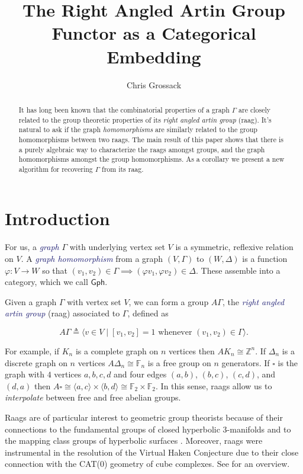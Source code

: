 \documentclass[microtype]{gtpart}
\author{Chris Grossack}
\title{The Right Angled Artin Group Functor as a Categorical Embedding}
\theoremstyle{definition}
\theoremstyle{theorem}
\newcommand{\teq}{\triangleq}
\newcommand*{\important}[1]{\textcolor{MidnightBlue}{\emph{#1}}}
\begin{document}
\maketitle

\begin{abstract}
  It has long been known that the combinatorial properties of a graph $\Gamma$
  are closely related to the group theoretic properties of its 
  \emph{right angled artin group} (raag). It's natural to ask if the 
  graph \emph{homomorphisms} are similarly related to the group homomorphisms 
  between two raags. The main result of this paper shows that there 
  is a purely algebraic way to characterize the raags amongst groups, and 
  the graph homomorphisms amongst the group homomorphisms. 
  As a corollary we 
  present a new algorithm for recovering $\Gamma$ from its raag.
\end{abstract}

\section{Introduction}
\label{intro}
  For us, a \important{graph} $\Gamma$ with underlying vertex set $V$ is a 
  symmetric, reflexive relation on $V$. A \important{graph homomorphism} from 
  a graph $(V,\Gamma)$ to $(W,\Delta)$ is a 
  function $\varphi : V \to W$ so that $(v_1, v_2) \in \Gamma \implies (\varphi v_1, \varphi v_2) \in \Delta$.
  These assemble into a category, which we call $\mathsf{Gph}$.

  Given a graph $\Gamma$ with vertex set $V$, we can form a group $A\Gamma$, the 
  \important{right angled artin group} (raag) associated to $\Gamma$, defined as

  \[ A\Gamma \teq \langle v \in V \mid [v_1, v_2] = 1 \text{ whenever } (v_1,v_2) \in \Gamma \rangle .\]

  For example, if $K_n$ is a complete graph on $n$ vertices then 
  $AK_n \cong \mathbb{Z}^n$. If $\Delta_n$ is a discrete graph on $n$ vertices
  $A\Delta_n \cong \mathbb{F}_n$ is a free group on $n$ generators. 
  If $\square$ is the graph with $4$ vertices $a,b,c,d$ and 
  four edges $(a,b)$, $(b,c)$, $(c,d)$, and $(d,a)$ then $A \square \cong 
  \langle a, c \rangle \times \langle b, d \rangle \cong \mathbb{F}_2 \times \mathbb{F}_2$.
  In this sense, raags allow us to \emph{interpolate} between free and free
  abelian groups. 

  Raags are of particular interest to geometric group theorists because
  of their connections to the fundamental groups of closed hyperbolic
  $3$-manifolds \cite{servatiusSurfaceSubgroupsGraph1989} 
  and to the mapping class groups of hyperbolic surfaces 
  \cite{kimGeometryCurveGraph2014}. Moreover, raags were instrumental in
  the resolution of the Virtual Haken Conjecture \cite{agolVirtualHakenConjecture2013}
  due to their close connection with the CAT(0) geometry of cube complexes. 
  See \cite{bestvinaGeometricGroupTheory2013} for an overview.
\end{document}
